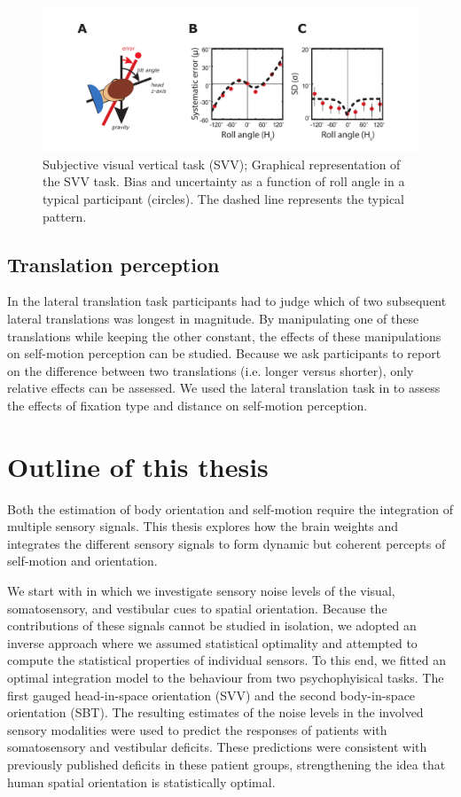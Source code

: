 \begin{figure}
    \includegraphics[width=1.0\textwidth]{src/intro/figures/svv.pdf}

    \caption{Subjective visual vertical task (SVV);  Graphical representation of the SVV task.  Bias and  uncertainty as a function of roll angle in a typical participant (circles). The dashed line represents the typical pattern.}
    \label{intro:fig5}
\end{figure}

\subsection{Translation perception}

In the lateral translation task participants had to judge which of two subsequent lateral translations was longest in magnitude. By manipulating one of these translations while keeping the other constant, the effects of these manipulations on self-motion perception can be studied. Because we ask participants to report on the difference between two translations (i.e. longer versus shorter), only relative effects can be assessed.  We used the lateral translation task in  to assess the effects of fixation type and distance on self-motion perception.


\section{Outline of this thesis}

Both the estimation of body orientation and self-motion require the integration of multiple sensory signals. This thesis explores how the brain weights and integrates the different sensory signals to form dynamic but coherent percepts of self-motion and orientation.

We start with  in which we investigate sensory noise levels of the visual, somatosensory, and vestibular cues to spatial orientation. Because the contributions of these signals cannot be studied in isolation, we adopted an inverse approach where we assumed statistical optimality and attempted to compute the statistical properties of individual sensors. To this end, we fitted an optimal integration model to the behaviour from two psychophyisical tasks. The first gauged head-in-space orientation (SVV) and the second body-in-space orientation (SBT). The resulting estimates of the noise levels in the involved sensory modalities were used to predict the responses of patients with somatosensory and vestibular deficits. These predictions were consistent with previously published deficits in these patient groups, strengthening the idea that human spatial orientation is statistically optimal.


